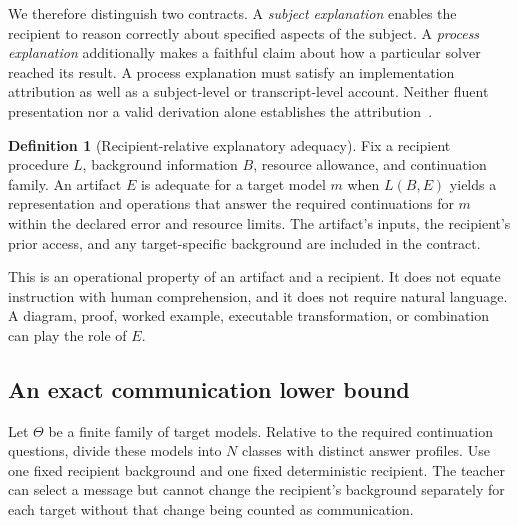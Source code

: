 \documentclass[11pt,letterpaper]{article}
\theoremstyle{plain}
\theoremstyle{definition}
\newtheorem{definition}[theorem]{Definition}
\begin{document}
We therefore distinguish two contracts. A \emph{subject explanation} enables the recipient to reason correctly about specified aspects of the subject. A \emph{process explanation} additionally makes a faithful claim about how a particular solver reached its result. A process explanation must satisfy an implementation attribution as well as a subject-level or transcript-level account. Neither fluent presentation nor a valid derivation alone establishes the attribution~\cite{jacovi}.

\begin{definition}[Recipient-relative explanatory adequacy]\label{def:explanation}
Fix a recipient procedure $L$, background information $B$, resource allowance, and continuation family. An artifact $E$ is adequate for a target model $m$ when $L(B,E)$ yields a representation and operations that answer the required continuations for $m$ within the declared error and resource limits. The artifact's inputs, the recipient's prior access, and any target-specific background are included in the contract.
\end{definition}
This is an operational property of an artifact and a recipient. It does not equate instruction with human comprehension, and it does not require natural language. A diagram, proof, worked example, executable transformation, or combination can play the role of $E$.

\subsection{An exact communication lower bound}
Let $\Theta$ be a finite family of target models. Relative to the required continuation questions, divide these models into $N$ classes with distinct answer profiles. Use one fixed recipient background and one fixed deterministic recipient. The teacher can select a message but cannot change the recipient's background separately for each target without that change being counted as communication.
\end{document}

